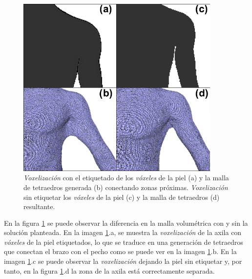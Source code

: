 \begin{figure}[ht]
  \centering
    \includegraphics[width=0.9\textwidth]{IMG/volumetrizacion4.png}
    \caption{
    \emph{Voxelización} con el etiquetado de los \emph{vóxeles} de la piel (a) y la malla de tetraedros generada (b) conectando zonas próximas. \emph{Voxelización} sin etiquetar los \emph{vóxeles} de la piel (c) y la malla de tetraedros (d) resultante.
    \label{fig:volsol}
    }

\end{figure}
%




En la figura \ref{fig:volsol} se puede observar la diferencia en la malla volumétrica con y sin la solución planteada. En la imagen \ref{fig:volsol}.a, se muestra la  \emph{voxelización} de la axila con \emph{vóxeles} de la piel etiquetados, lo que se traduce en una generación de tetraedros que conectan el brazo con el pecho como se puede ver en la imagen \ref{fig:volsol}.b. En la imagen \ref{fig:volsol}.c  se puede observar la \emph{voxelización} dejando la piel sin etiquetar y, por tanto, en la figura \ref{fig:volsol}.d la zona de la axila está correctamente separada.
%

